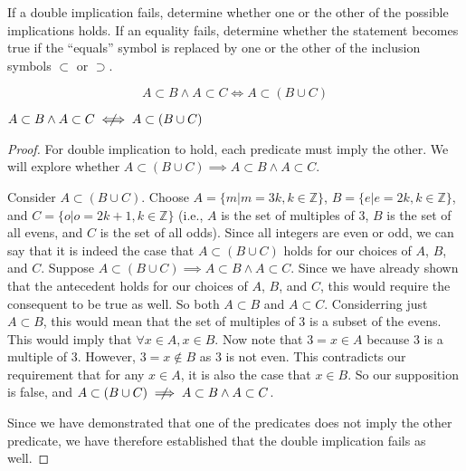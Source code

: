 \documentclass[main.tex]{subfiles}
\begin{document}
If a double implication fails, determine whether one or the other of the
possible implications holds. If an equality fails, determine whether the
statement becomes true if the ``equals'' symbol is replaced by one or the other
of the inclusion symbols \(\subset\) or \(\supset\).

\subproblem{}\label{2a}
\[A \subset B \land A \subset C \iff A \subset (B \cup C)\]
\begin{thm}
	\(A \subset B \land A \subset C \centernot\iff A \subset (B \cup C)\)
\end{thm}
\begin{proof}
	For double implication to hold, each predicate must imply the other. We
	will explore whether
	\(A \subset (B \cup C) \implies A \subset B \land A \subset C\).

	Consider \(A \subset (B \cup C)\). Choose
	\(A = \{m | m = 3k, k \in \mathbb{Z}\}\),
	\(B = \{e | e = 2k, k \in \mathbb{Z}\}\),
	and \(C = \{o | o = 2k + 1, k \in \mathbb{Z}\}\) (i.e., \(A\) is the set
	of multiples of	3, \(B\) is the set of all evens, and \(C\) is the set
	of all odds). Since all integers are even or odd, we can say that it is
	indeed the case that \(A \subset (B \cup C)\) holds for our choices of
	\(A\), \(B\), and \(C\). Suppose
	\(A \subset (B \cup C) \implies A \subset B \land A \subset C\). Since
	we have already shown that the antecedent holds for our choices of
	\(A\), \(B\), and \(C\), this would require the consequent to be true as
	well. So both \(A \subset B\) and \(A \subset C\). Considerring just
	\(A \subset B\), this would mean that the set of multiples of 3 is a
	subset of the evens. This would imply that \(\forall x \in A, x \in B\).
	Now note that \(3 = x \in A\) because 3 is a multiple of 3. However,
	\(3 = x \notin B\) as 3 is not even. This contradicts our requirement
	that for any \(x \in A\), it is also the case that \(x \in B\). So our
	supposition is false, and
	\(A \subset (B \cup C) \centernot\implies A \subset B \land A \subset C\).

	Since we have demonstrated that one of the predicates does not imply the
	other predicate, we have therefore established that the double
	implication fails as well.
\end{proof}
\end{document}
